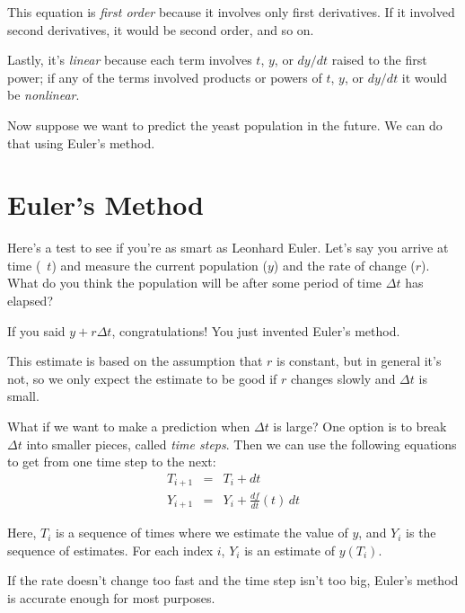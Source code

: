 
This equation is \emph{first order} because it involves only first
derivatives.  If it involved second derivatives, it would be second order,
and so on.


Lastly, it's \emph{linear} because each term involves $t$, $y$, or
$dy/dt$ raised to the first power; if any of the terms involved
products or powers of $t$, $y$, or $dy/dt$ it would be
\emph{nonlinear}.

Now suppose we want to predict the yeast population in the future.  We can do that using Euler's method.

\section{Euler's Method}

Here's a test to see if you're as smart as Leonhard Euler.  Let's say you arrive at time (~$t$) and measure the current population ($y$) and
the rate of change ($r$).  What do you think the population will
be after some period of time $\Delta t$ has elapsed?

If you said $y + r \Delta t$, congratulations!  You just invented
Euler's method.


This estimate is based on the assumption that $r$ is constant, but
in general it's not, so we only expect the estimate to be good if
$r$ changes slowly and $\Delta t$ is small.

What if we want to make a prediction when $\Delta t$ is large?
One option is to break $\Delta t$ into smaller pieces, called
\emph{time steps}. Then we can use the following equations to get from one time step to the next:
\begin{eqnarray*}
T_{i+1} &=& T_i + dt                       \\
Y_{i+1} &=& Y_i + \frac{df}{dt}(t) \, dt
\end{eqnarray*}

Here, $T_i$ is a sequence of times where we estimate the value of $y$, and $Y_i$ is the sequence of estimates.
For each index $i$, $Y_i$ is an estimate of $y(T_i)$.


If the rate doesn't change too fast and the time step isn't
too big, Euler's method is accurate enough for most purposes.

